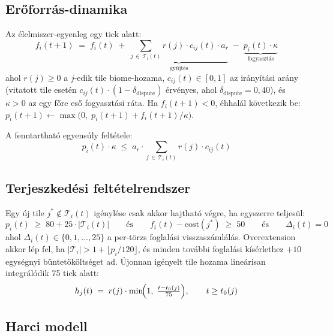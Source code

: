 ﻿\documentclass[a4paper,12pt]{report}
\begin{document}
\subsection*{Erőforrás-dinamika}

Az élelmiszer-egyenleg egy tick alatt:
\begin{equation}
f_i(t+1) \;=\; f_i(t)
\;+\; \underbrace{\sum_{j \,\in\, \mathcal{T}_i(t)} r(j)\cdot c_{ij}(t)\cdot a_r}_{\text{gyűjtés}}
\;-\; \underbrace{p_i(t)\cdot\kappa}_{\text{fogyasztás}}
\end{equation}
ahol $r(j) \geq 0$ a $j$-edik tile biome-hozama, $c_{ij}(t) \in [0,1]$ az irányítási arány
(vitatott tile esetén $c_{ij}(t)\cdot(1 - \delta_{\text{dispute}})$ érvényes, ahol
$\delta_{\text{dispute}} = 0{,}40$), és $\kappa > 0$ az egy főre eső fogyasztási ráta.
Ha $f_i(t+1) < 0$, éhhalál következik be: $p_i(t+1) \leftarrow \max\bigl(0,\; p_i(t+1) + f_i(t+1)/\kappa\bigr)$.

A fenntartható egyensúly feltétele:
\begin{equation}
p_i(t)\cdot\kappa \;\leq\; a_r \cdot \sum_{j \,\in\, \mathcal{T}_i(t)} r(j)\cdot c_{ij}(t)
\end{equation}

\subsection*{Terjeszkedési feltételrendszer}

Egy új tile $j^* \notin \mathcal{T}_i(t)$ igénylése csak akkor hajtható végre, ha egyszerre
teljesül:
\begin{equation}
p_i(t) \;\geq\; 80 + 25\cdot|\mathcal{T}_i(t)|
\qquad \text{és} \qquad
f_i(t) - \mathrm{cost}(j^*) \;\geq\; 50
\qquad \text{és} \qquad
\Delta_i(t) = 0
\end{equation}
ahol $\Delta_i(t) \in \{0,1,\ldots,25\}$ a per-törzs foglalási visszaszámlálás. Overextension
akkor lép fel, ha $|\mathcal{T}_i| > 1 + \lfloor p_i/120 \rfloor$, és minden további
foglalási kísérlethez $+10$ egységnyi büntetőköltséget ad. Újonnan igényelt tile hozama
lineárisan integrálódik 75 tick alatt:
\begin{equation}
h_j(t) \;=\; r(j)\cdot\min\!\Bigl(1,\;\tfrac{t - t_0(j)}{75}\Bigr), \qquad t \geq t_0(j)
\end{equation}

\subsection*{Harci modell}
\end{document}
